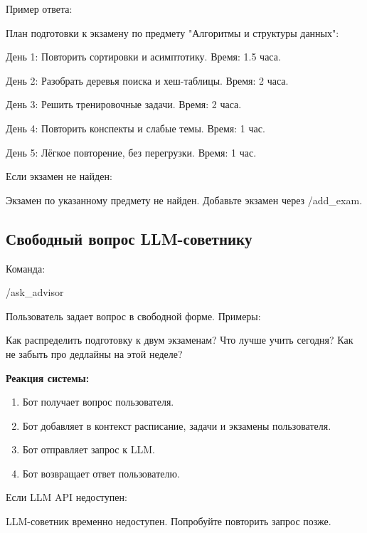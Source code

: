 \documentclass[10pt,a4paper,final]{article} %
\begin{document}
Пример ответа:

\begin{Code}
План подготовки к экзамену по предмету "Алгоритмы и структуры данных":

День 1:
Повторить сортировки и асимптотику.
Время: 1.5 часа.

День 2:
Разобрать деревья поиска и хеш-таблицы.
Время: 2 часа.

День 3:
Решить тренировочные задачи.
Время: 2 часа.

День 4:
Повторить конспекты и слабые темы.
Время: 1 час.

День 5:
Лёгкое повторение, без перегрузки.
Время: 1 час.
\end{Code}

Если экзамен не найден:

\begin{Code}
Экзамен по указанному предмету не найден. Добавьте экзамен через /add_exam.
\end{Code}

\subsection{Свободный вопрос LLM-советнику}

Команда:

\begin{Code}
/ask_advisor
\end{Code}

Пользователь задает вопрос в свободной форме. Примеры:

\begin{Code}
Как распределить подготовку к двум экзаменам?
Что лучше учить сегодня?
Как не забыть про дедлайны на этой неделе?
\end{Code}

\textbf{Реакция системы:}

\begin{enumerate}
    \item Бот получает вопрос пользователя.
    \item Бот добавляет в контекст расписание, задачи и экзамены пользователя.
    \item Бот отправляет запрос к LLM.
    \item Бот возвращает ответ пользователю.
\end{enumerate}

Если LLM API недоступен:

\begin{Code}
LLM-советник временно недоступен. Попробуйте повторить запрос позже.
\end{Code}
\end{document}
